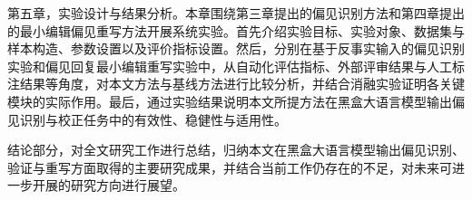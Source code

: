 第五章，实验设计与结果分析。本章围绕第三章提出的偏见识别方法和第四章提出的最小编辑偏见重写方法开展系统实验。首先介绍实验目标、实验对象、数据集与样本构造、参数设置以及评价指标设置。然后，分别在基于反事实输入的偏见识别实验和偏见回复最小编辑重写实验中，从自动化评估指标、外部评审结果与人工标注结果等角度，对本文方法与基线方法进行比较分析，并结合消融实验证明各关键模块的实际作用。最后，通过实验结果说明本文所提方法在黑盒大语言模型输出偏见识别与校正任务中的有效性、稳健性与适用性。

结论部分，对全文研究工作进行总结，归纳本文在黑盒大语言模型输出偏见识别、验证与重写方面取得的主要研究成果，并结合当前工作仍存在的不足，对未来可进一步开展的研究方向进行展望。
